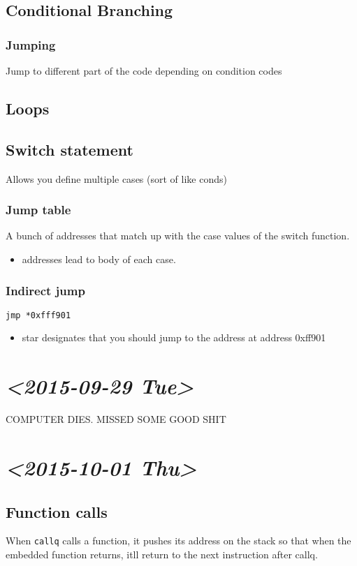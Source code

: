\documentclass[11pt]{article}
\begin{document}
\subsection{Conditional Branching}
\label{sec-7-3}
\subsubsection{Jumping}
\label{sec-7-3-1}
Jump to different part of the code depending on condition codes
\subsection{Loops}
\label{sec-7-4}
\subsection{Switch statement}
\label{sec-7-5}
Allows you define multiple cases (sort of like conds)
\subsubsection{Jump table}
\label{sec-7-5-1}
A bunch of addresses that match up with the case values of the switch function.
\begin{itemize}
\item addresses lead to body of each case.
\end{itemize}
\subsubsection{Indirect jump}
\label{sec-7-5-2}
\texttt{jmp *0xfff901} 
\begin{itemize}
\item star designates that you should jump to the address at address 0xff901
\end{itemize}
\section{\textit{<2015-09-29 Tue>}}
\label{sec-8}
COMPUTER DIES. MISSED SOME GOOD SHIT 
\section{\textit{<2015-10-01 Thu>}}
\label{sec-9}
\subsection{Function calls}
\label{sec-9-1}
When \texttt{callq} calls a function, it pushes its address on the stack so that when the embedded function
returns, itll return to the next instruction after callq.
\end{document}
